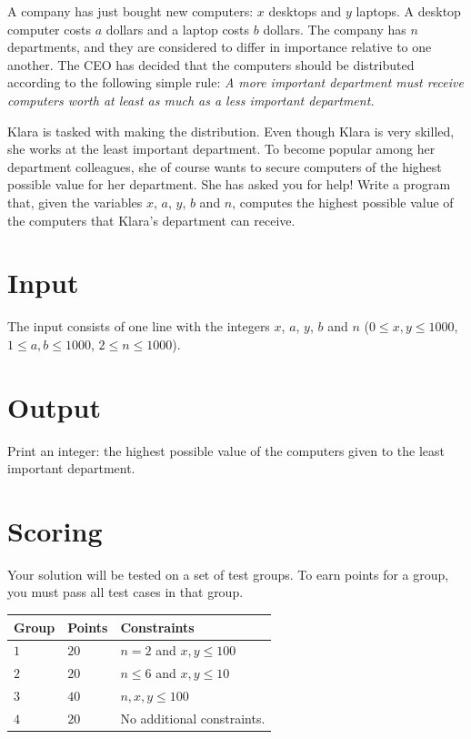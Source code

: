 
A company has just bought new computers: $x$ desktops and $y$
laptops. A desktop computer costs $a$ dollars and a laptop costs $b$
dollars. The company has $n$ departments, and they
are considered to differ in importance relative to one another. The CEO has decided that the computers
should be distributed according to the following simple rule: {\em A more important department must receive computers worth at least as much as a less important department.}

Klara is tasked with making the distribution. Even though Klara is very skilled, she works at the least important department. To become popular among her department colleagues, she of course wants to secure computers of the highest possible value for her department.
She has asked you for help! Write a program that, given the variables $x$, $a$, $y$, $b$ and $n$, computes the highest possible value of the computers that Klara's department can receive.


\section*{Input}
The input consists of one line with the integers $x$, $a$, $y$, $b$ and $n$ ($0 \leq x,y \leq 1000$, $1 \leq a,b \leq 1000$, $2 \leq n \leq 1000$).

\section*{Output}
Print an integer: the highest possible value of the computers given to the least important department.

\section*{Scoring}
Your solution will be tested on a set of test groups.
To earn points for a group, you must pass all test cases in that group.

\noindent
\begin{tabular}{| l | l | p{12cm} |}
  \hline
  \textbf{Group} & \textbf{Points} & \textbf{Constraints} \\ \hline
  $1$    & $20$        & $n=2$ and $x,y \leq 100$ \\ \hline
  $2$    & $20$        & $n \leq 6$ and $x,y \leq 10$ \\ \hline
  $3$    & $40$        & $n,x,y \leq 100$ \\ \hline
  $4$    & $20$        & No additional constraints.  \\ \hline
\end{tabular}
